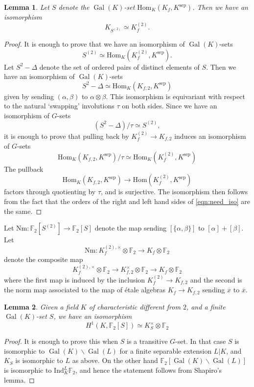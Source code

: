 \documentclass[11pt]{amsart}
\def\F{\mathbb F}
\theoremstyle{plain}
\newtheorem{lemma}{Lemma}
\theoremstyle{definition}
\DeclareMathOperator{\Gal}{Gal}
\newcommand{\Ind}{\mathrm{Ind}}
\newcommand{\sep}{\mathrm{sep}}
\newcommand{\Nm}{\mathrm{Nm}}
\newcommand{\Hom}{\mathrm{Hom}}
\begin{document}
\begin{lemma}
Let $S$ denote the $\Gal (K)$-set $\Hom _K (K_f ,K^{\sep })$. Then we have an isomorphism
\[
K_{S^{(2)}}\simeq K_f ^{(2)}.
\]
\end{lemma}
\begin{proof}
It is enough to prove that we have an isomorphism of $\Gal (K)$-sets
\[
S^{(2)}\simeq \Hom _K (K_f ^{(2)},K^{\sep }).
\]
Let $S^2 -\Delta $ denote the set of ordered pairs of distinct elements of $S$. Then we have an isomorphism of $\Gal (K)$-sets
\[
S^2 -\Delta \simeq \Hom _K (K_{f,2},K^{\sep })
\]
given by sending $(\alpha ,\beta )$ to $\alpha \otimes \beta $. This isomorphism is equivariant with respect to the natural `swapping' involutions $\tau $ on both sides. Since we have an isomorphism of $G$-sets 
\[
(S^2 -\Delta )/\tau \simeq S^{(2)},
\]
it is enough to prove that pulling back by $K_f ^{(2)}\to K_{f,2}$ induces an isomorphism of $G$-sets
\begin{equation}\label{eqn:need_iso}
\Hom _K (K_{f,2},K^{\sep })/\tau \simeq \Hom _K (K_f ^{(2)},K^{\sep })
\end{equation}
The pullback
\[
\Hom _K (K_{f,2},K^{\sep })\to \Hom (K_f ^{(2)},K^{\sep })
\]
factors through quotienting by $\tau $, and is surjective. The isomorphism then follows from the fact that the orders of the right and left hand sides of \eqref{eqn:need_iso} are the same.
\end{proof}
Let $\Nm :\F _2 [S^{(2)}]\to \F _2 [S]$ denote the map sending $[\{\alpha ,\beta \}] $ to $[\alpha ] +[\beta ]$. Let
\[
\Nm :K_f ^{(2),\times }\otimes \F _2 \to K_f \otimes \F _2 
\]
denote the composite map
\[
K_f ^{(2),\times }\otimes \F _2 \to K_{f,2}^\times \otimes \F _2 \to K_f \otimes \F _2
\]
where the first map is induced by the inclusion $K_f ^{(2)}\to K_{f,2}$ and the second is the norm map associated to the map of \'etale algebras $K_f \to K_{f,2}$ sending $\overline{x}$ to $\overline{x}$.

\begin{lemma}
Given a field $K$ of characteristic different from $2$, and a finite $\Gal (K)$-set $S$, we have an isomorphism
\[
H^1 (K,\F _2 [S])\simeq K_S ^\times \otimes \F _2 
\]
\end{lemma}
\begin{proof}
It is enough to prove this when $S$ is a transitive $G$-set. In that case $S$ is isomorphic to $\Gal (K) \backslash \Gal (L)$ for a finite separable extension $L|K$, and $K_S $ is isomorphic to $L$ as above. On the other hand $\F_ 2[\Gal (K)\backslash \Gal (L)]$ is isomorphic to $\Ind ^L _K \F _2 $, and hence the statement follows from Shapiro's lemma.
\end{proof}
\end{document}

